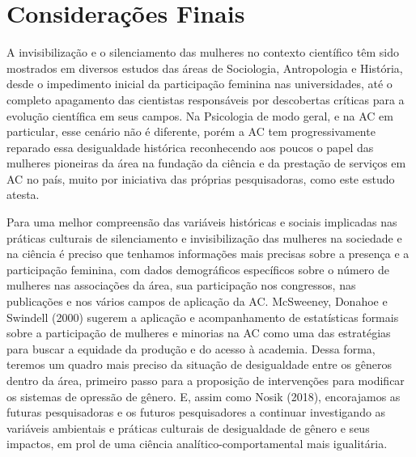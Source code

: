 \section{Considerações Finais}
A invisibilização e o silenciamento das mulheres no contexto científico têm sido mostrados em diversos estudos das áreas de Sociologia, Antropologia e História, desde o impedimento inicial da participação feminina nas universidades, até o completo apagamento das cientistas responsáveis por descobertas críticas para a evolução científica em seus campos. Na Psicologia de modo geral, e na AC em particular, esse cenário não é diferente, porém a AC tem progressivamente reparado essa desigualdade histórica reconhecendo aos poucos o papel das mulheres pioneiras da área na fundação da ciência e da prestação de serviços em AC no país, muito por iniciativa das próprias pesquisadoras, como este estudo atesta. 

Para uma melhor compreensão das variáveis históricas e sociais implicadas nas práticas culturais de silenciamento e invisibilização das mulheres na sociedade e na ciência é preciso que tenhamos informações mais precisas sobre a presença e a participação feminina, com dados demográficos específicos sobre o número de mulheres nas associações da área, sua participação nos congressos, nas publicações e nos vários campos de aplicação da AC. McSweeney, Donahoe e Swindell (2000) sugerem a aplicação e acompanhamento de estatísticas formais sobre a participação de mulheres e minorias na AC como uma das estratégias para buscar a equidade da produção e do acesso à academia. Dessa forma, teremos um quadro mais preciso da situação de desigualdade entre os gêneros dentro da área, primeiro passo para a proposição de intervenções para modificar os sistemas de opressão de gênero. E, assim como Nosik (2018), encorajamos as futuras pesquisadoras e os futuros pesquisadores a continuar investigando as variáveis ambientais e práticas culturais de desigualdade de gênero e seus impactos, em prol de uma ciência analítico-comportamental mais igualitária.

